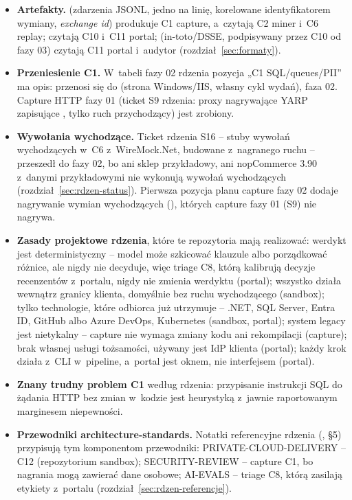 \begin{itemize}
  \item \textbf{Artefakty.}  (zdarzenia JSONL, jedno na linię, korelowane
        identyfikatorem wymiany, \emph{exchange id}) produkuje C1 capture, a~czytają C2 miner
        i~C6 replay;  czytają C10 i~C11 portal;
         (in-toto/DSSE, podpisywany przez C10 od fazy 03) czytają C11
        portal i~audytor (rozdział~\ref{sec:formaty}).
  \item \textbf{Przeniesienie C1.} W~tabeli fazy 02 rdzenia pozycja „C1 SQL/queues/PII” ma
        opis: przenosi się do  (strona Windows/IIS,
        własny cykl wydań), faza 02. Capture HTTP fazy 01 (ticket S9 rdzenia: proxy nagrywające
        YARP zapisujące , tylko ruch przychodzący) jest zrobiony.
  \item \textbf{Wywołania wychodzące.} Ticket rdzenia S16 -- stuby wywołań wychodzących
        w~C6 z~WireMock.Net, budowane z~nagranego ruchu -- przeszedł do fazy 02, bo ani sklep
        przykładowy, ani nopCommerce 3.90 z~danymi przykładowymi nie wykonują wywołań
        wychodzących (rozdział~\ref{sec:rdzen-status}). Pierwsza pozycja planu capture fazy
        02 dodaje nagrywanie wymian wychodzących (), których capture
        fazy 01 (S9) nie nagrywa.
  \item \textbf{Zasady projektowe rdzenia}, które te repozytoria mają realizować: werdykt jest
        deterministyczny -- model może szkicować klauzule albo porządkować różnice, ale nigdy
        nie decyduje, więc triage C8, którą kalibrują decyzje recenzentów z~portalu, nigdy nie
        zmienia werdyktu (portal); wszystko działa wewnątrz granicy klienta, domyślnie bez
        ruchu wychodzącego (sandbox); tylko
        technologie, które odbiorca już utrzymuje -- .NET, SQL Server, Entra ID, GitHub albo
        Azure DevOps, Kubernetes (sandbox, portal); system legacy jest nietykalny -- capture nie
        wymaga zmiany kodu ani rekompilacji (capture); brak własnej usługi tożsamości, używany
        jest IdP klienta (portal); każdy krok działa z~CLI w~pipeline, a~portal jest oknem, nie
        interfejsem (portal).
  \item \textbf{Znany trudny problem C1} według rdzenia: przypisanie instrukcji SQL do żądania
        HTTP bez zmian w~kodzie jest heurystyką z~jawnie raportowanym marginesem niepewności.
  \item \textbf{Przewodniki architecture-standards.} Notatki referencyjne rdzenia
        (, §5) przypisują tym komponentom przewodniki:
        PRIVATE-CLOUD-DELIVERY -- C12 (repozytorium sandbox); SECURITY-REVIEW -- capture C1,
        bo nagrania mogą zawierać dane osobowe; AI-EVALS -- triage C8, którą zasilają
        etykiety z~portalu (rozdział~\ref{sec:rdzen-referencje}).
\end{itemize}

